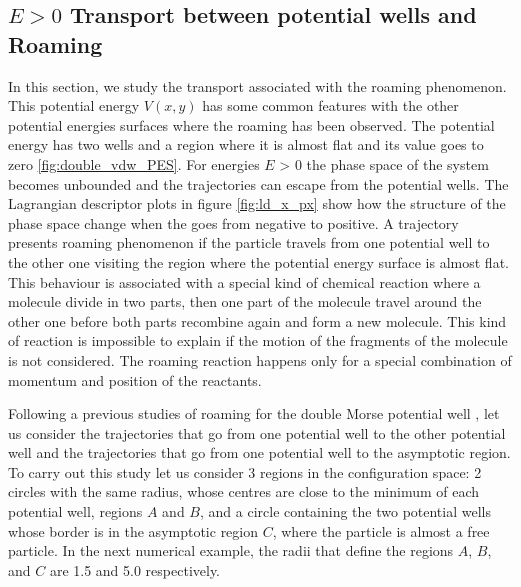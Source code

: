 \documentclass[10pt,aps,onecolumn,superscriptaddress]{revtex4-2}
\begin{document}
\newpage

\subsection{ $E>0$ Transport between potential wells and Roaming }


In this section, we study the transport associated with the roaming phenomenon. This potential energy $V(x,y)$ has some common features with the other potential energies surfaces where the roaming has been observed. The potential energy has two wells and a region where it is almost flat and its value goes to zero \ref{fig:double_vdw_PES}. For energies $E$ > 0 the phase space of the system becomes unbounded and the trajectories can escape from the potential wells. The Lagrangian descriptor plots in figure \ref{fig:ld_x_px} show how the structure of the phase space change when the goes from negative to positive. A trajectory presents roaming phenomenon if the particle travels from one potential well to the other one visiting the region where the potential energy surface is almost flat. This behaviour is associated with a special kind of chemical reaction where a molecule divide in two parts, then one part of the molecule travel around the other one before both parts recombine again and form a new molecule. This kind of reaction is impossible to explain if the motion of the fragments of the molecule is not considered. The roaming reaction happens only for a special combination of momentum and position of the reactants. 

Following a previous studies of roaming for the double Morse potential well \cite{Carpenter2017,Carpenter2018, GonzalezMontoya2020}, let us consider the trajectories that go from one potential well to the other potential well and the trajectories that go from one potential well to the asymptotic region. To carry out this study let us consider 3 regions in the configuration space: 2 circles with the same radius, whose centres are close to the minimum of each potential well, regions $A$ and $B$, and a circle containing the two potential wells whose border is in the asymptotic region $C$, where the particle is almost a free particle. In the next numerical example, the radii that define the regions $A$, $B$, and $C$ are 1.5 and 5.0 respectively.
\end{document}
